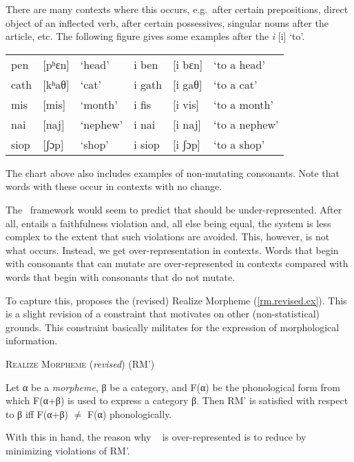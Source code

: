 \documentclass[output=paper,
modfonts
]{LSP/langsci}
\begin{document}
There are many contexts where this occurs, e.g.\ after certain prepositions, direct object of an inflected verb, after certain possessives,  singular nouns after the article, etc. The following figure gives some examples after the  \emph{i} [i] `to'.

\ea
\begin{tabular}[t]{llllll}
pen  & [pʰɛn] & `head'   & i ben  & [i bɛn] & `to a head' \\
cath & [kʰaθ] & `cat'    & i gath & [i gaθ] & `to a cat' \\
mis  & [mis]  & `month'  & i fis  & [i vis] & `to a month' \\
nai  & [naj]  & `nephew' & i nai  & [i naj] & `to a nephew' \\
siop & [ʃɔp]  & `shop'   & i siop & [i ʃɔp] & `to a shop'
\end{tabular}
\z

\noindent The chart above also includes examples of non-mutating consonants. Note that words with these occur in  contexts with no change.

The \io\ framework would seem to predict that  should be under-represented. After all,  entails a faithfulness violation and, all else being equal, the system is less complex to the extent that such violations are avoided. This, however, is not what occurs. Instead, we get over-representation in  contexts. Words that begin with consonants that can mutate are over-represented in  contexts compared with words that begin with consonants that do not mutate.

To capture this, \citet{inopt.phon} proposes the (revised) Realize Morpheme  (\ref{rm.revised.ex}). This is a slight revision of a constraint that \citet{kurisu} motivates on other (non-statistical) grounds. This constraint basically militates for the expression of morphological information.

\ea
\label{rm.revised.ex}
\textsc{Realize Morpheme} (\emph{revised}) (RM')

Let α be a \emph{morpheme}, β be a  category, and F(α) be the phonological form from which F(α+β) is used to express a  category β. Then RM' is satisfied with respect to β iff F(α+β) $\ne$ F(α) phonologically.
\z

\noindent With this in hand, the reason why \w\  is over-represented is to reduce  by minimizing violations of RM'.
\end{document}
